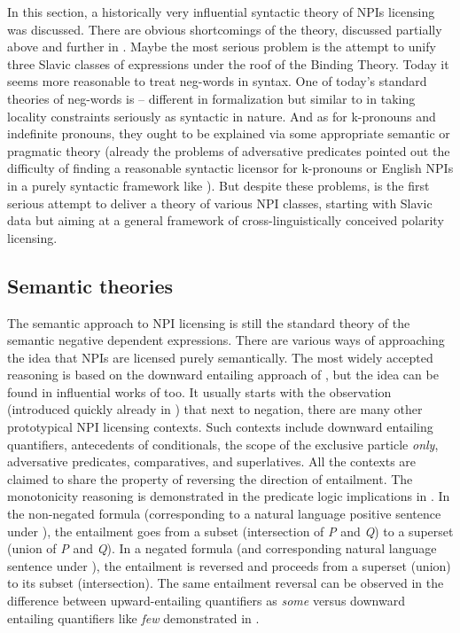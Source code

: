 \documentclass[output=paper,colorlinks,citecolor=brown]{langscibook}
\begin{document}
\noindent In this section, a historically very influential syntactic theory of NPIs licensing was discussed. There are obvious shortcomings of the theory, discussed partially above and further in . Maybe the most serious problem is the attempt to unify three Slavic classes of expressions under the roof of the Binding Theory. Today it seems more reasonable to treat neg-words in syntax. One of today's standard theories of neg-words is \citet{zeijlstra2004sentential} -- different in formalization but similar to \citet{progovac1994negative} in taking locality constraints seriously as syntactic in nature. And as for k-pronouns and indefinite pronouns, they ought to be explained via some appropriate semantic or pragmatic theory (already the problems of adversative predicates pointed out the difficulty of finding a reasonable syntactic licensor for k-pronouns or English NPIs in a purely syntactic framework like \citealt{progovac1994negative}). But despite these problems, \citet{progovac1994negative} is the first serious attempt to deliver a theory of various NPI classes, starting with Slavic data but aiming at a general framework of cross-linguistically conceived polarity licensing.

\subsection{Semantic theories}\label{semantic-theories}

The semantic approach to NPI licensing is still the standard theory of the semantic negative dependent expressions. There are various ways of approaching the idea that NPIs are licensed purely semantically. The most widely accepted reasoning is based on the downward entailing approach of \citet{ladusaw1992expressing}, but the idea can be found in influential works of \citet{heim1984note,ladusaw1992expressing,kadmon1993any,krifka1995semantics,giannakidou1997landscape,lahiri1998focus} too. It usually starts with the observation (introduced quickly already in ) that next to negation, there are many other prototypical NPI licensing contexts. Such contexts include downward entailing quantifiers, antecedents of conditionals, the scope of the exclusive particle \emph{only}, adversative predicates, comparatives, and superlatives. All the contexts are claimed to share the property of reversing the direction of entailment. The monotonicity reasoning is demonstrated in the predicate logic implications in . In the non-negated formula  (corresponding to a natural language positive sentence under ), the entailment goes from a subset (intersection of \emph{P} and \emph{Q}) to a superset (union of \emph{P} and \emph{Q}). In a negated formula  (and corresponding natural language sentence under ), the entailment is reversed and proceeds from a superset (union) to its subset (intersection). The same entailment reversal can be observed in the difference between upward-entailing quantifiers as \emph{some} versus downward entailing quantifiers like \emph{few} demonstrated in .
\end{document}
